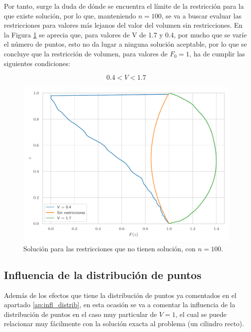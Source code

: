 Por tanto, surge la duda de dónde se encuentra el límite de la restricción para la que existe solución, por lo que, manteniendo $n = 100$, se va a buscar evaluar las restricciones para valores más lejanos del valor del volumen sin restricciones. En la Figura \ref{fig:vol_no_sol_n100} se aprecia que, para valores de V de 1.7 y 0.4, por mucho que se varíe el número de puntos, esto no da lugar a ninguna solución aceptable, por lo que se concluye que la restricción de volumen, para valores de $F_0 = 1$, ha de cumplir las siguientes condiciones:

\begin{equation}
    \boxed{0.4 < V < 1.7}
\end{equation}

\begin{figure}[h]
    \centering
    \includegraphics[width = 0.6 \linewidth]{Figures/01/vol_no_sol_n100.pdf}
    \caption{Solución para las restricciones que no tienen solución, con $n = 100$.}
    \label{fig:vol_no_sol_n100}
\end{figure}


\subsection{Influencia de la distribución de puntos}

Además de los efectos que tiene la distribución de puntos ya comentados en el apartado \ref{ap:infl_distrib}, en esta ocasión se va a comentar la influencia de la distribución de puntos en el caso muy particular de $V = 1$, el cual se puede relacionar muy fácilmente con la solución exacta al problema (un cilindro recto).

